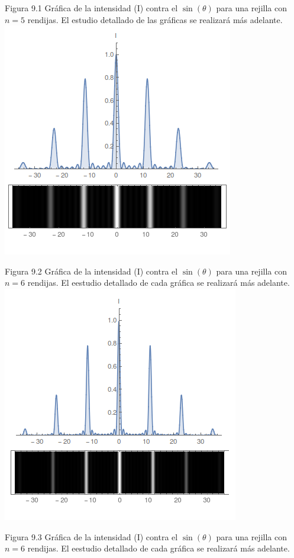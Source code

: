 \documentclass[%
 reprint,
 amsmath,amssymb,
 aps,
]{revtex4-1}
\begin{document}
Figura 9.1 Gráfica de la intensidad (I) contra el $\sin{(\theta)}$ para una rejilla con $n=5$ rendijas. El estudio detallado de las gráficas se realizará más adelante. \\

\includegraphics[scale= 0.5]{6.png}

Figura 9.2 Gráfica de la intensidad (I) contra el $\sin{(\theta)}$ para una rejilla con $n=6$ rendijas. El eestudio detallado de cada gráfica se realizará más adelante. \\

\includegraphics[scale= 0.5]{10.png}

Figura 9.3 Gráfica de la intensidad (I) contra el $\sin{(\theta)}$ para una rejilla con $n=6$ rendijas. El eestudio detallado de cada gráfica se realizará más adelante. \\
\end{document}
